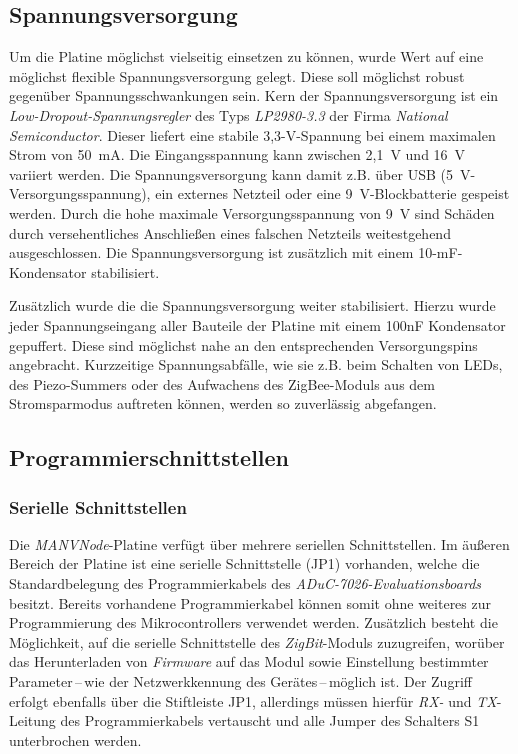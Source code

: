 \subsection{Spannungsversorgung}
Um die Platine möglichst vielseitig einsetzen zu können, wurde Wert auf eine möglichst flexible Spannungsversorgung gelegt. Diese
soll möglichst robust gegenüber Spannungsschwankungen sein. Kern der Spannungsversorgung ist ein 
\emph{Low-Dropout-Span\-nungs\-reg\-ler} des Typs \emph{LP2980-3.3} der Firma \emph{National Semiconductor}. Dieser liefert eine stabile
3,3-V-Spannung bei einem maximalen Strom von 50~mA. Die Eingangsspannung kann zwischen 2,1~V und 16~V variiert werden.
Die Spannungsversorgung kann damit z.B. über USB (5~V-Versorgungsspannung), ein externes Netzteil oder eine 
9~V-Blockbatterie gespeist werden. Durch die hohe maximale Versorgungsspannung von 9~V sind Schäden durch versehentliches
Anschließen eines falschen Netzteils weitestgehend ausgeschlossen. Die Spannungsversorgung ist zusätzlich mit einem 
10-mF-Kondensator stabilisiert.

Zusätzlich wurde die die Spannungsversorgung weiter stabilisiert. Hierzu wurde jeder Spannungseingang aller Bauteile der
Platine mit einem 100nF Kondensator gepuffert. Diese sind möglichst nahe an den entsprechenden Versorgungspins angebracht.
Kurzzeitige Spannungsabfälle, wie sie z.B. beim Schalten von LEDs, des Piezo-Summers oder des Aufwachens des ZigBee-Moduls
aus dem Stromsparmodus auftreten können, werden so zuverlässig abgefangen.

\subsection{Programmierschnittstellen}

\subsubsection{Serielle Schnittstellen}
Die \emph{MANVNode}-Platine verfügt über mehrere seriellen Schnittstellen. Im äußeren Bereich der Platine ist eine serielle 
Schnittstelle (JP1) vorhanden, welche die Standardbelegung des Programmierkabels des \emph{ADuC-7026-Evaluationsboards}
besitzt.  Bereits vorhandene Programmierkabel können somit ohne weiteres zur Programmierung des Mikrocontrollers 
verwendet werden.  Zusätzlich besteht die Möglichkeit, auf die serielle Schnittstelle des \emph{ZigBit}-Moduls 
zuzugreifen, worüber das Herunterladen von \emph{Firmware} auf das Modul sowie Einstellung bestimmter 
Parameter\,--\,wie der Netzwerkkennung des Gerätes\,--\,möglich ist.
Der Zugriff erfolgt ebenfalls über die Stiftleiste JP1, allerdings müssen hierfür \emph{RX-} und \emph{TX}-Leitung des 
Programmierkabels vertauscht und alle Jumper des Schalters S1 unterbrochen werden. 

